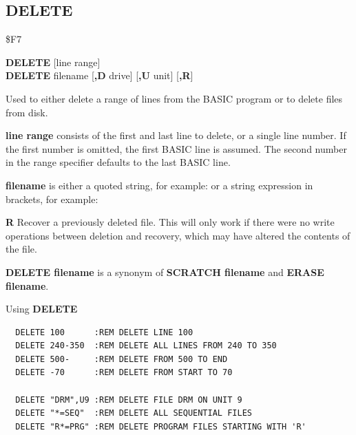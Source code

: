 \subsection{DELETE}
\begin{description}[leftmargin=2cm,style=nextline]
\item [Token:] \$F7
\item [Format:] {\bf DELETE} [line range] \\
                {\bf DELETE} filename [{\bf,D} drive] [{\bf,U} unit] [{\bf,R}]
\item [Usage:] Used to either delete
               a range of lines from the BASIC program or to delete files from disk.

               {\bf line range} consists of the first and last
               line to delete, or a single line number.
               If the first number is omitted, the
               first BASIC line is assumed.
               The second number in the range specifier defaults
               to the last BASIC line.

   {\bf filename} is either a quoted string, for example:  or
   a string expression in brackets, for example: 

   \drivedefinition

   \unitdefinition

   {\bf R} Recover a previously deleted file.
   This will only work if there were no write operations
   between deletion and recovery, which may have altered the
   contents of the file.

\item [Remarks:] {\bf DELETE filename} is a synonym of {\bf SCRATCH filename}
                 and {\bf ERASE filename}.

\item [Examples:] Using {\bf DELETE}
\begin{tcolorbox}[colback=black,coltext=white]
\verbatimfont{\codefont}
\begin{verbatim}
  DELETE 100      :REM DELETE LINE 100
  DELETE 240-350  :REM DELETE ALL LINES FROM 240 TO 350
  DELETE 500-     :REM DELETE FROM 500 TO END
  DELETE -70      :REM DELETE FROM START TO 70

  DELETE "DRM",U9 :REM DELETE FILE DRM ON UNIT 9
  DELETE "*=SEQ"  :REM DELETE ALL SEQUENTIAL FILES
  DELETE "R*=PRG" :REM DELETE PROGRAM FILES STARTING WITH 'R'
\end{verbatim}
\end{tcolorbox}
\end{description}

